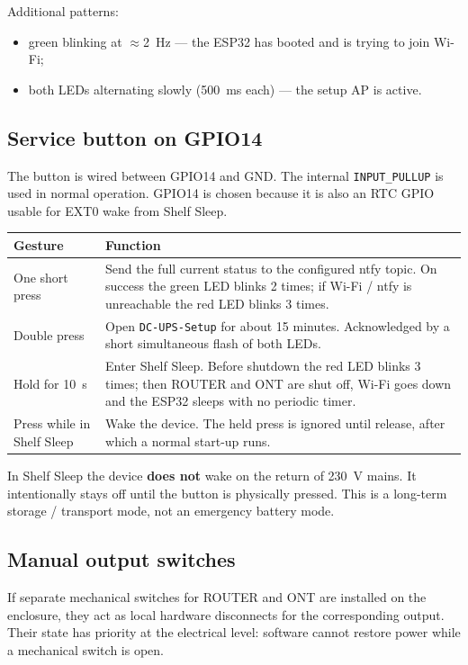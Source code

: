 \documentclass[11pt,a4paper]{article}
\begin{document}
Additional patterns:
\begin{itemize}
  \item green blinking at $\approx$2~Hz --- the ESP32 has booted and is trying to join Wi-Fi;
  \item both LEDs alternating slowly (500~ms each) --- the setup AP is active.
\end{itemize}

\subsection{Service button on GPIO14}
The button is wired between GPIO14 and GND. The internal \texttt{INPUT\_PULLUP} is used in normal operation. GPIO14 is chosen because it is also an RTC GPIO usable for EXT0 wake from Shelf Sleep.

\begin{tabularx}{\textwidth}{@{}p{38mm}X@{}}
\toprule
\textbf{Gesture} & \textbf{Function} \\
\midrule
One short press & Send the full current status to the configured ntfy topic. On success the green LED blinks 2 times; if Wi-Fi / ntfy is unreachable the red LED blinks 3 times. \\
Double press & Open \texttt{DC-UPS-Setup} for about 15 minutes. Acknowledged by a short simultaneous flash of both LEDs. \\
Hold for 10~s & Enter Shelf Sleep. Before shutdown the red LED blinks 3 times; then ROUTER and ONT are shut off, Wi-Fi goes down and the ESP32 sleeps with no periodic timer. \\
Press while in Shelf Sleep & Wake the device. The held press is ignored until release, after which a normal start-up runs. \\
\bottomrule
\end{tabularx}

\begin{tcolorbox}[colback=lightwarn,colframe=warn,title=Important: Shelf Sleep]
In Shelf Sleep the device \textbf{does not} wake on the return of 230~V mains. It intentionally stays off until the button is physically pressed. This is a long-term storage / transport mode, not an emergency battery mode.
\end{tcolorbox}

\subsection{Manual output switches}
If separate mechanical switches for ROUTER and ONT are installed on the enclosure, they act as local hardware disconnects for the corresponding output. Their state has priority at the electrical level: software cannot restore power while a mechanical switch is open.
\end{document}
